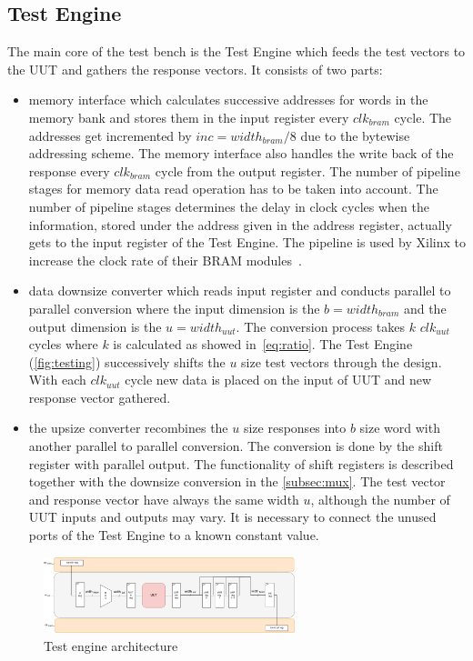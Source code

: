 \subsection{Test Engine}\label{ssec:engine}
The main core of the test bench is the Test Engine which feeds the test vectors to the UUT and gathers the response vectors. It consists of two parts:
\begin{itemize}
    \item memory interface which calculates successive addresses for words in the memory bank and stores them in the input register every $clk_{bram}$ cycle. The addresses get incremented by $inc = width_{bram}/8$ due to the bytewise addressing scheme. The memory interface also handles the write back of the response every $clk_{bram}$ cycle from the output register. The number of pipeline stages for memory data read operation has to be taken into account. The number of pipeline stages determines the delay in clock cycles when the information, stored under the address given in the address register, actually gets to the input register of the Test Engine. The pipeline is used by Xilinx to increase the clock rate of their BRAM modules~\cite{report:BRAM}.
    \item data downsize converter which reads input register and conducts parallel to parallel conversion where the input dimension is the $b=width_{bram}$ and the output dimension is the $u=width_{uut}$. The conversion process takes $k$ $clk_{uut}$ cycles where $k$ is calculated as showed in~\autoref{eq:ratio}. The Test Engine (\autoref{fig:testing}) successively shifts the $u$ size test vectors through the design. With each $clk_{uut}$ cycle new data is placed on the input of UUT and new response vector gathered.
    \item the upsize converter recombines the $u$ size responses into $b$ size word with another parallel to parallel conversion. The conversion is done by the shift register with parallel output. The functionality of shift registers is described together with the downsize conversion in the \autoref{subsec:mux}. The test vector and response vector have always the same width $u$, although the number of UUT inputs and outputs may vary. It is necessary to connect the unused ports of the Test Engine to a known constant value.
\end{itemize}
\begin{figure}[h]
\centering
\includegraphics[width=0.65\textwidth]{figures/Test_Engine_complex.png}
\caption{Test engine architecture}
\label{fig:testing}
\end{figure}


